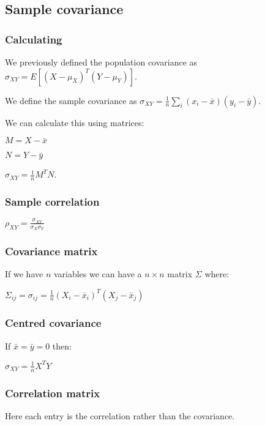 
\subsection{Sample covariance}

\subsubsection{Calculating}

We previously defined the population covariance as \(\sigma_{XY}=E[(X-\mu_X)^T(Y-\mu_Y)]\).

We define the sample covariance as \(\sigma_{XY}=\frac{1}{n}\sum_i(x_i-\bar x)(y_i-\bar y)\).

We can calculate this using matrices:

\(M=X-\bar x\)

\(N=Y-\bar y\)

\(\sigma_{XY}=\frac{1}{n}M^TN\).

\subsubsection{Sample correlation}

\(\rho_{XY}=\frac{\sigma_{XY}}{\sigma_X \sigma_Y}\)

\subsubsection{Covariance matrix}

If we have \(n\) variables we can have a \(n\times n \) matrix \(\Sigma \) where:

\(\Sigma_{ij} = \sigma_{ij}=\frac{1}{n}(X_i-\bar x_i)^T(X_j-\bar x_j)\)

\subsubsection{Centred covariance}

If \(\bar x = \bar y = 0\) then:

\(\sigma_{XY}=\frac{1}{n}X^TY\)

\subsubsection{Correlation matrix}

Here each entry is the correlation rather than the covariance.

